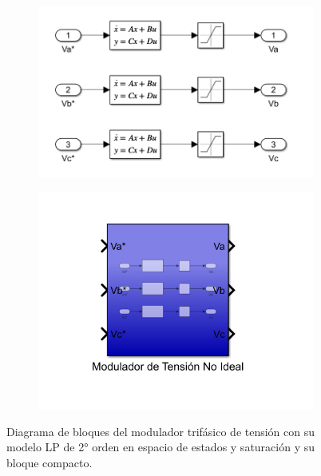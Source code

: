 \documentclass{article}
\begin{document}
\begin{figure}[H]
    \centering
    \begin{subfigure}[t]{0.45\textwidth}
        \centering
        \includegraphics[width=\textwidth]{Imagenes/Bloques_Modulador_Tension_No_Ideal.png}
        \caption{}
        \label{fig:Bloques_Modulador_Tension_No_Ideal}
    \end{subfigure}
    \hfill %
    \begin{subfigure}[t]{0.4\textwidth}
        \centering
        \includegraphics[width=\textwidth]{Imagenes/Bloques_Modulador_Tension_No_Ideal_Compacto.png}
        \caption{}
        \label{fig:Bloques_Modulador_Tension_No_Ideal_Compacto}
    \end{subfigure}
    \caption{Diagrama de bloques del modulador trifásico de tensión con su modelo LP de 2° orden en espacio de estados y saturación y su bloque compacto.}
    \label{fig:Diagrama_bloques_modulador_tension_NoIdeal}
\end{figure}
\end{document}
